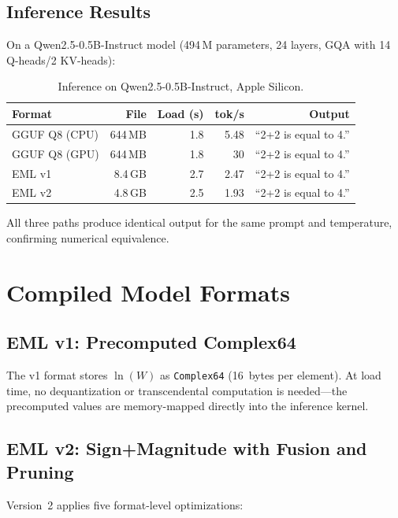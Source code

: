 \documentclass[acmsmall,nonacm]{acmart}
\begin{document}
\subsection{Inference Results}

On a Qwen2.5-0.5B-Instruct model (494\,M parameters, 24 layers, GQA
with 14 Q-heads/2 KV-heads):

\begin{table}[h]
\caption{Inference on Qwen2.5-0.5B-Instruct, Apple Silicon.}
\label{tab:inference}
\centering
\begin{tabular}{lrrrr}
\toprule
\textbf{Format} & \textbf{File} & \textbf{Load (s)} & \textbf{tok/s} & \textbf{Output} \\
\midrule
GGUF Q8 (CPU)  & 644\,MB  & 1.8 & 5.48 & ``2+2 is equal to 4.'' \\
GGUF Q8 (GPU)  & 644\,MB  & 1.8 & 30   & ``2+2 is equal to 4.'' \\
EML v1         & 8.4\,GB  & 2.7 & 2.47 & ``2+2 is equal to 4.'' \\
EML v2         & 4.8\,GB  & 2.5 & 1.93 & ``2+2 is equal to 4.'' \\
\bottomrule
\end{tabular}
\end{table}

All three paths produce identical output for the same prompt and
temperature, confirming numerical equivalence.


\section{Compiled Model Formats}
\label{sec:format}

\subsection{EML v1: Precomputed Complex64}

The v1 format stores $\ln(W)$ as \texttt{Complex64} (16~bytes per
element).  At load time, no dequantization or transcendental computation
is needed---the precomputed values are memory-mapped directly into the
inference kernel.

\subsection{EML v2: Sign+Magnitude with Fusion and Pruning}

Version~2 applies five format-level optimizations:
\end{document}

